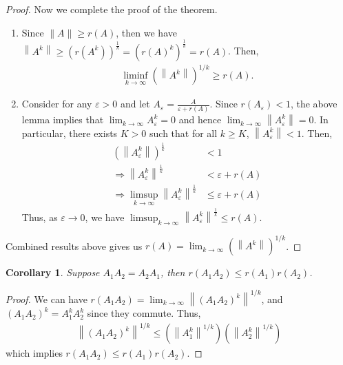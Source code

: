 \documentclass[11pt]{book}
\newtheorem{corollary}{Corollary}[section]
\theoremstyle{definition}
\numberwithin{equation}{subsection}
\begin{document}
\begin{proof}
Now we complete the proof of the theorem.
\begin{enumerate}[label=(\arabic*)]
    \item Since $\|A\|\geq r(A)$, then we have $\left\|A^k\right\| \geq \left(r\left(A^k\right) \right)^{\frac{1}{k}} = \left(r(A)^k \right)^{\frac{1}{k}}  = r(A)$. Then,
    \begin{align*}
        \liminf_{k\to\infty} \left(\left\|A^k\right\|\right)^{1/k} \geq r(A).
    \end{align*}
    \item Consider for any $\varepsilon > 0$ and let $A_\varepsilon = \frac{A}{\varepsilon + r(A)}$. Since $r(A_\varepsilon) < 1$, the above lemma implies that $\lim_{k\to\infty}A_\varepsilon^k = 0$ and hence $\lim_{k\to\infty}\left\|A_\varepsilon^k\right\| = 0$. In particular, there exists $K > 0$ such that for all $k \geq K$, $\left\|A_\varepsilon^k\right\| < 1$. Then, 
    \begin{align*}
        \left(\left\|A_\varepsilon^k\right\| \right)^{\frac{1}{k}} & < 1 \\
        \Rightarrow \left\|A_\varepsilon^k\right\|^{\frac{1}{k}} & < \varepsilon + r(A) \\
        \Rightarrow \limsup_{k\to\infty} \left\|A_\varepsilon^k\right\|^{\frac{1}{k}} & \leq \varepsilon + r(A)
    \end{align*}
    Thus, as $\varepsilon \to 0$, we have $\limsup_{k\to\infty} \left\|A_\varepsilon^k\right\|^{\frac{1}{k}} \leq r(A)$.
\end{enumerate}
Combined results above gives us $r(A) = \lim_{k\to\infty} \left(\left\|A^k\right\|\right)^{1/k}$.
\end{proof}

\medskip

\begin{corollary}
Suppose $A_1 A_2 = A_2 A_1$, then $r(A_1 A_2) \leq r(A_1) r(A_2)$.
\end{corollary}
\begin{proof}
We can have $r(A_1 A_2) = \lim_{k\to\infty} \left\|(A_1 A_2)^k\right\|^{1/k}$, and $(A_1 A_2)^k = A_1^k A_2^k$ since they commute. Thus, 
\begin{align*}
    \left\|(A_1 A_2)^k\right\|^{1/k} \leq \left(\left\|A_1^k\right\|^{1/k} \right) \left(\left\|A_2^k\right\|^{1/k} \right)
\end{align*}
which implies $r(A_1 A_2) \leq r(A_1) r(A_2)$.
\end{proof}
\end{document}
